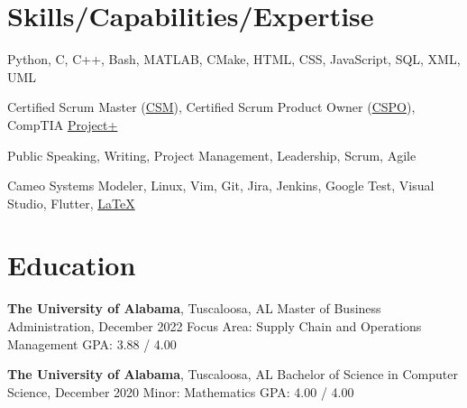 \documentclass[hidelinks, 11pt]{article}
\begin{document}
\makecvtitle
\vspace{0.5mm}

\section{Skills/Capabilities/Expertise}

\begin{description}[widest=Programming Langauges:]
  \item[Programming Languages\normalfont:] Python, C, C++, Bash, MATLAB, CMake, HTML, CSS, JavaScript, SQL, XML, UML
  \item[Certifications\normalfont:] Certified Scrum Master (\href{https://bcert.me/sqcdwlemz}{\color{blue}CSM}), Certified Scrum Product Owner (\href{https://bcert.me/smphouhlt}{\color{blue}CSPO}), CompTIA \href{https://www.credly.com/badges/9177a9b8-29d9-4896-95cc-f448e908ddb7}{\color{blue}Project+}
  \item[Soft Skills\normalfont:] Public Speaking, Writing, Project Management, Leadership, Scrum, Agile
  \item[Tools\normalfont:] Cameo Systems Modeler, Linux, Vim, Git, Jira, Jenkins, Google Test, Visual Studio, Flutter, \href{https://github.com/chwerth/LaTeX\_Resume}{\color{blue}LaTeX}
\end{description}

\section{Education}
\vspace{-1.4mm}
\begin{multicols}{2}

  \begin{minipage}{0.5\textwidth}
    \textbf{The University of Alabama}, Tuscaloosa, AL \newline
    Master of Business Administration, December 2022 \newline
    Focus Area: Supply Chain and Operations Management \newline
    GPA: 3.88 / 4.00
  \end{minipage}

  \begin{minipage}{0.5\textwidth}
    \textbf{The University of Alabama}, Tuscaloosa, AL \newline
    Bachelor of Science in Computer Science, December 2020 \newline
    Minor: Mathematics \newline
    GPA: 4.00 / 4.00
  \end{minipage}

\end{multicols}
\end{document}
